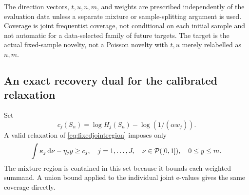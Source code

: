 \documentclass[11pt]{article}
\numberwithin{equation}{section}
\theoremstyle{definition}
\theoremstyle{remark}
\newcommand{\dd}{\,\mathrm d}\newcommand{\norm}[1]{\left\lVert#1\right\rVert}\newcommand{\Scal}{\mathsf S}\newcommand{\Tcal}{\mathsf T}
\begin{document}
The direction vectors, $t,u,n,m$, and weights are prescribed independently of the evaluation data unless a separate mixture or sample-splitting argument is used. Coverage is joint frequentist coverage, not conditional on each initial sample and not automatic for a data-selected family of future targets. The target is the actual fixed-sample novelty, not a Poisson novelty with $t,u$ merely relabelled as $n,m$.

\subsection{An exact recovery dual for the calibrated relaxation}
Set
\begin{equation}\label{eq:calconstraints}
 c_j(S_n)=\log H_j(S_n)-\log(1/(\alpha w_j)).
\end{equation}
A valid relaxation of \eqref{eq:fixedjointregion} imposes only
\begin{equation}\label{eq:jointlinear}
 \int\kappa_j\dd\nu-\eta_jy\ge c_j,
 \quad j=1,\ldots,J,\quad \nu\in\Prob([0,1]),\quad 0\le y\le m.
\end{equation}
The mixture region is contained in this set because it bounds each weighted summand. A union bound applied to the individual joint e-values gives the same coverage directly.
\end{document}
